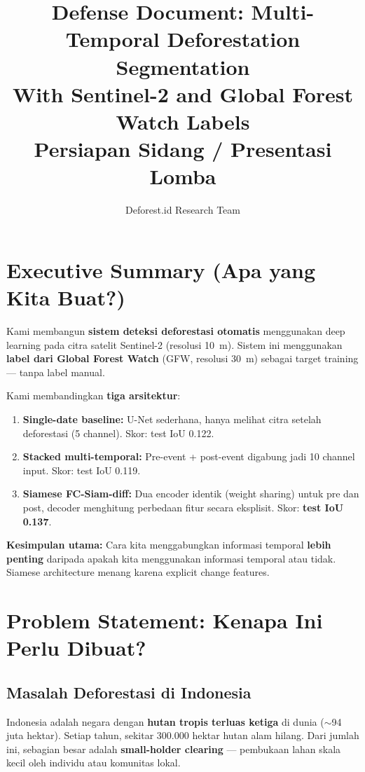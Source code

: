 \documentclass[10pt,a4paper,onecolumn]{article}
\title{\textbf{Defense Document: Multi-Temporal Deforestation Segmentation \\
With Sentinel-2 and Global Forest Watch Labels} \\
\small Persiapan Sidang / Presentasi Lomba}
\author{Deforest.id Research Team}
\date{}
\begin{document}
\maketitle
\thispagestyle{empty}

\tableofcontents
\newpage

\section{Executive Summary (Apa yang Kita Buat?)}

Kami membangun \textbf{sistem deteksi deforestasi otomatis} menggunakan
deep learning pada citra satelit Sentinel-2 (resolusi 10~m). Sistem ini
menggunakan \textbf{label dari Global Forest Watch} (GFW, resolusi
30~m) sebagai target training — tanpa label manual.

Kami membandingkan \textbf{tiga arsitektur}:
\begin{enumerate}[nosep]
    \item \textbf{Single-date baseline:} U-Net sederhana, hanya melihat
          citra setelah deforestasi (5 channel). Skor: test IoU 0.122.
    \item \textbf{Stacked multi-temporal:} Pre-event + post-event
          digabung jadi 10 channel input. Skor: test IoU 0.119.
    \item \textbf{Siamese FC-Siam-diff:} Dua encoder identik (weight
          sharing) untuk pre dan post, decoder menghitung perbedaan
          fitur secara eksplisit. Skor: \textbf{test IoU 0.137}.
\end{enumerate}

\textbf{Kesimpulan utama:} Cara kita menggabungkan informasi temporal
\textbf{lebih penting} daripada apakah kita menggunakan informasi
temporal atau tidak. Siamese architecture menang karena explicit change
features.

\section{Problem Statement: Kenapa Ini Perlu Dibuat?}

\subsection{Masalah Deforestasi di Indonesia}
Indonesia adalah negara dengan \textbf{hutan tropis terluas ketiga}
di dunia ($\sim$94 juta hektar). Setiap tahun, sekitar 300.000 hektar
hutan alam hilang. Dari jumlah ini, sebagian besar adalah
\textbf{small-holder clearing} — pembukaan lahan skala kecil oleh
individu atau komunitas lokal.
\end{document}
